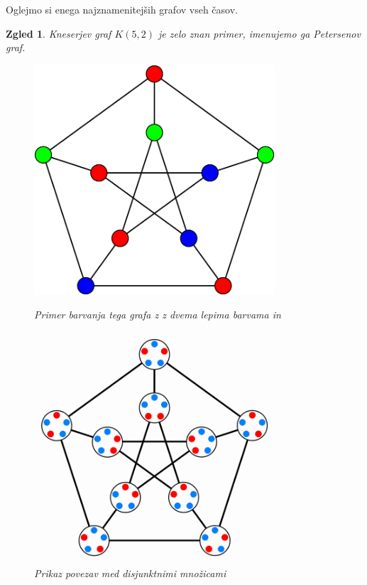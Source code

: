 \documentclass[a4paper,12pt]{article}
\newtheorem{zgled}{Zgled}
\begin{document}
Oglejmo si enega najznamenitejših grafov vseh časov.

\begin{zgled}{Kneserjev graf $K(5,2)$ je zelo znan primer, imenujemo ga Petersenov graf. 

\begin{figure}[h!]
	\centering
	\begin{minipage}{0.45\textwidth}
		\centering
		\includegraphics[width=0.8\textwidth]{petersenov_graf_barvanje}
        	\caption{Primer barvanja tega grafa z z dvema lepima barvama in \color{Green}{svetlo zeleno}}
    	\end{minipage}\hfill
    	\begin{minipage}{0.45\textwidth}
       	 \centering
        	 \includegraphics[width=0.8\textwidth]{petersenov_graf_mnozice}
       	 \caption{Prikaz povezav med disjunktnimi množicami}
    	\end{minipage}
\end{figure}

}
\end{zgled}
\end{document}
